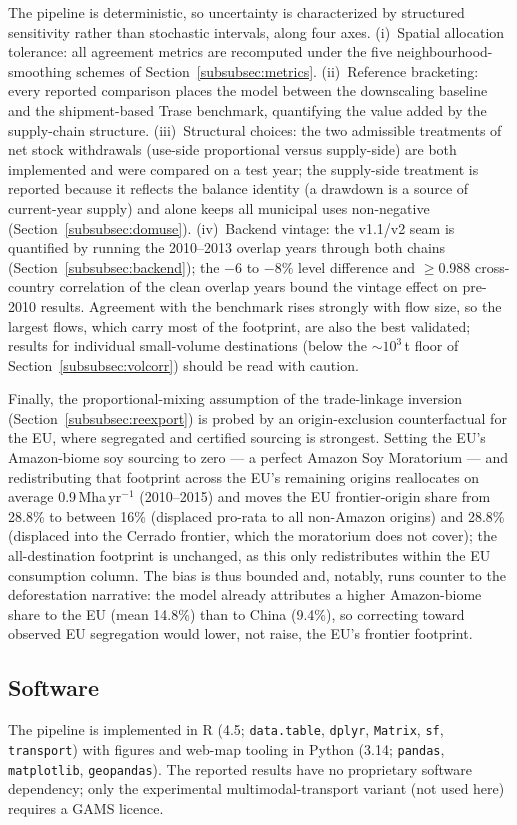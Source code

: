 The pipeline is deterministic, so uncertainty is characterized by structured
sensitivity rather than stochastic intervals, along four axes. (i)~Spatial
allocation tolerance: all agreement metrics are recomputed under the five
neighbourhood-smoothing schemes of Section~\ref{subsubsec:metrics}.
(ii)~Reference bracketing: every reported comparison places the model
between the downscaling baseline and the shipment-based
Trase benchmark, quantifying the value added by the supply-chain
structure. (iii)~Structural choices: the two admissible treatments
of net stock withdrawals (use-side proportional versus supply-side) are both
implemented and were compared on a test year; the supply-side treatment is
reported because it reflects the balance identity (a drawdown is a source of
current-year supply) and alone keeps all municipal uses non-negative
(Section~\ref{subsubsec:domuse}). (iv)~Backend vintage: the v1.1/v2 seam is
quantified by running the 2010--2013 overlap years through both chains
(Section~\ref{subsubsec:backend}); the $-6$ to $-8\%$ level difference and
$\geq$0.988 cross-country correlation of the clean overlap years bound the
vintage effect on pre-2010 results.
Agreement with the benchmark rises strongly with flow size, so the largest
flows, which carry most of the footprint, are also the best validated; results
for individual small-volume destinations (below the $\sim$$10^3$\,t floor of
Section~\ref{subsubsec:volcorr}) should be read with caution.

Finally, the proportional-mixing assumption of the trade-linkage inversion
(Section~\ref{subsubsec:reexport}) is probed by an origin-exclusion
counterfactual for the EU, where segregated and certified sourcing is
strongest. Setting the EU's Amazon-biome soy sourcing to zero --- a
perfect Amazon Soy Moratorium --- and redistributing that footprint across
the EU's remaining origins reallocates on average 0.9\,Mha\,yr$^{-1}$
(2010--2015) and moves the EU frontier-origin share from 28.8\% to between
16\% (displaced pro-rata to all non-Amazon origins) and 28.8\% (displaced
into the Cerrado frontier, which the moratorium does not cover); the
all-destination footprint is unchanged, as this only redistributes within
the EU consumption column. The bias is thus bounded and, notably, runs
counter to the deforestation narrative: the model already attributes a
higher Amazon-biome share to the EU (mean 14.8\%) than to China (9.4\%),
so correcting toward observed EU segregation would lower, not raise, the
EU's frontier footprint.

\subsection{Software}\label{subsec:software}
The pipeline is implemented in R (4.5; \texttt{data.table}, \texttt{dplyr},
\texttt{Matrix}, \texttt{sf}, \texttt{transport}) with figures and
web-map tooling in Python (3.14; \texttt{pandas}, \texttt{matplotlib},
\texttt{geopandas}). The reported results have no proprietary software
dependency; only the experimental multimodal-transport variant (not used
here) requires a GAMS licence.
